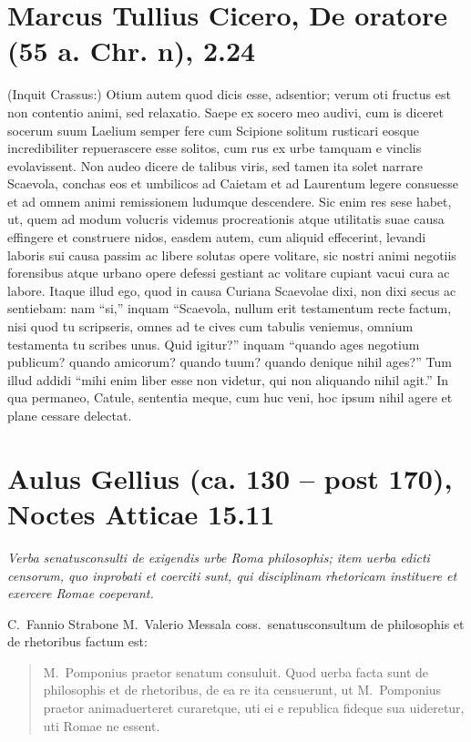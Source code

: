 \section*{Marcus Tullius Cicero, De oratore (55 a. Chr. n), 2.24}

(Inquit Crassus:) Otium autem quod dicis esse, adsentior; verum oti fructus est non contentio animi, sed relaxatio. Saepe ex socero meo audivi, cum is diceret socerum suum Laelium semper fere cum Scipione solitum rusticari eosque incredibiliter repuerascere esse solitos, cum rus ex urbe tamquam e vinclis evolavissent. Non audeo dicere de talibus viris, sed tamen ita solet narrare Scaevola, conchas eos et umbilicos ad Caietam et ad Laurentum legere consuesse et ad omnem animi remissionem ludumque descendere. Sic enim res sese habet, ut, quem ad modum volucris videmus procreationis atque utilitatis suae causa effingere et construere nidos, easdem autem, cum aliquid effecerint, levandi laboris sui causa passim ac libere solutas opere volitare, sic nostri animi negotiis forensibus atque urbano opere defessi gestiant ac volitare cupiant vacui cura ac labore. Itaque illud ego, quod in causa Curiana Scaevolae dixi, non dixi secus ac sentiebam: nam ``si,'' inquam ``Scaevola, nullum erit testamentum recte factum, nisi quod tu scripseris, omnes ad te cives cum tabulis veniemus, omnium testamenta tu scribes unus. Quid igitur?'' inquam ``quando ages negotium publicum? quando amicorum? quando tuum? quando denique nihil ages?'' Tum illud addidi ``mihi enim liber esse non videtur, qui non aliquando nihil agit.'' In qua permaneo, Catule, sententia meque, cum huc veni, hoc ipsum nihil agere et plane cessare delectat.

\section*{Aulus Gellius (ca. 130 – post 170), Noctes Atticae 15.11}

\textit{Verba senatusconsulti de exigendis urbe Roma philosophis; item uerba edicti censorum, quo inprobati et coerciti sunt, qui disciplinam rhetoricam instituere et exercere Romae coeperant.}

\medskip


C.~Fannio Strabone M.~Valerio Messala coss.\ senatusconsultum de philosophis et de rhetoribus factum est:
\begin{quotation}
\noindent M.~Pomponius praetor senatum consuluit. Quod uerba facta sunt de philosophis et de rhetoribus, de ea re ita censuerunt, ut M.~Pomponius praetor animaduerteret curaretque, uti ei e republica fideque sua uideretur, uti Romae ne essent.
\end{quotation}

